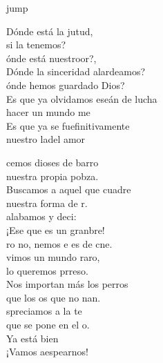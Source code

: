\begin{cancion}jump\\
	\begin{chorus}%
		Dónde está la jutud,\\
	\jump
	si la tenemos?\\
		ónde está nuestroor?,\\
		Dónde la sinceridad  alardeamos?\\
		ónde hemos guardado Dios?\\
		Es que ya olvidamos eseán de lucha\\
		 hacer un mundo me\\
		Es que ya se fuefinitivamente\\
		nuestro ladel amor\jump\\
	\end{chorus}%
	cemos dioses de barro\\
	 nuestra propia pobza.\\
	\jump
Buscamos a aquel que cuadre\\
	 nuestra forma de r.\\
	 alabamos y deci:\\
	¡Ese que es un granbre! \\
	ro no, nemos e es de cne.\\
	\jump
	vimos un mundo raro,\\
	lo queremos prreso.\\
	\jump
Nos importan más los perros\\
	que los os que no nan. \\
	spreciamos a la te\\
	que se pone en el o.\\
	Ya está bien\\
	¡Vamos aespearnos!\\
\end{cancion}%

